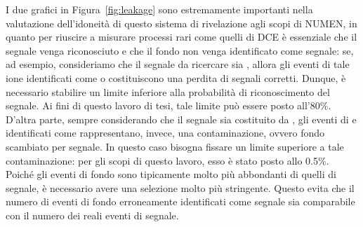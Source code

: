 I due grafici in Figura~\ref{fig:leakage} sono estremamente importanti nella valutazione dell'idoneità di questo sistema di rivelazione agli scopi di NUMEN, in quanto per riuscire a misurare processi rari come quelli di DCE è essenziale che il segnale venga riconosciuto e che il fondo non venga identificato come segnale: se, ad esempio, consideriamo che il segnale da ricercare sia , allora gli eventi di tale ione identificati come  o  costituiscono una perdita di segnali corretti. 
Dunque, è necessario stabilire un limite inferiore alla probabilità di riconoscimento del segnale.
Ai fini di questo lavoro di tesi, tale limite può essere posto all'80\%.
D'altra parte, sempre considerando che il segnale sia costituito da , gli eventi di  e  identificati come  rappresentano, invece, una contaminazione, ovvero fondo scambiato per segnale.
In questo caso bisogna fissare un limite superiore a tale contaminazione:
per gli scopi di questo lavoro, esso è stato posto allo 0.5\%.
Poiché gli eventi di fondo sono tipicamente molto più abbondanti di quelli di segnale, è necessario avere una selezione molto più stringente.
Questo evita che il numero di eventi di fondo erroneamente identificati come segnale sia comparabile con il numero dei reali eventi di segnale.







